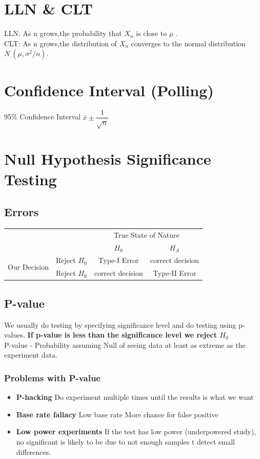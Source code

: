 \documentclass[]{article}
\begin{document}
\begin{multicols}{2}
    \section*{LLN \& CLT}
    LLN: As n grows,the probability that $X_n$ is close to $\mu$ .\\
    CLT: As n grows,the distribution of $X_n$ converges to the normal distribution $N ~ (\mu, \sigma^2/n)$.
    \section*{Confidence Interval (Polling)}
    95\% Confidence Interval $\bar{x} \pm \dfrac{1}{\sqrt{n}}$

    \section*{Null Hypothesis Significance Testing}
    \subsection*{Errors}
    \begin{tabular}{c c|c|c|}
                                      &              & \multicolumn{2}{c}{True State of Nature}                    \\
                                      &              & $H_0$                                    & $H_A$            \\ \cline{2-4}
        \multirow{2}{*}{Our Decision} & Reject $H_0$ & Type-I Error                             & correct decision \\ \cline{2-4}
                                      & Reject $H_0$ & correct decision                         & Type-II Error    \\ \cline{2-4}
    \end{tabular}
    \subsection*{P-value}
    We usually do testing by specifying significance level and do testing using p-values.
    \textbf{If p-value is less than the significance level we reject $H_0$}\\
    P-value - Probability assuming Null of seeing data at least as extreme as the experiment data.
    \subsubsection*{Problems with P-value}
    \begin{itemize}
        \item \textbf{P-hacking} Do experiment multiple times until the results is what we want
        \item \textbf{Base rate fallacy} Low base rate \rightarrow More chance for false positive
        \item \textbf{Low power experiments} If the test has low power (underpowered study), no significant is likely to be due to not enough samples t
              detect small differences.
    \end{itemize}

\end{multicols}
\end{document}
